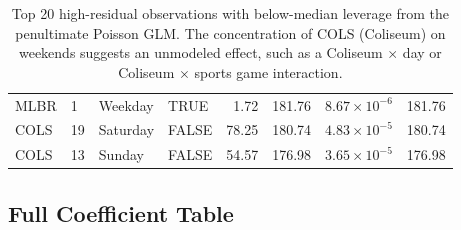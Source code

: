 \documentclass[11pt, letterpaper]{article}
\begin{document}
\begin{table}[h]
\begin{tabular}{llllrrrr}
MLBR  & 1  & Weekday  & TRUE  &  1.72  & 181.76 & $8.67 \times 10^{-6}$ & 181.76 \\
COLS  & 19 & Saturday & FALSE & 78.25  & 180.74 & $4.83 \times 10^{-5}$ & 180.74 \\
COLS  & 13 & Sunday   & FALSE & 54.57  & 176.98 & $3.65 \times 10^{-5}$ & 176.98 \\
\hline
\end{tabular}
\caption{Top 20 high-residual observations with below-median leverage from the penultimate
Poisson GLM. The concentration of COLS (Coliseum) on weekends suggests an
unmodeled effect, such as a Coliseum $\times$ day or Coliseum $\times$ sports game interaction.}
\label{tab:high_resid}
\end{table}

\newpage
\subsection*{Full Coefficient Table}
\end{document}
